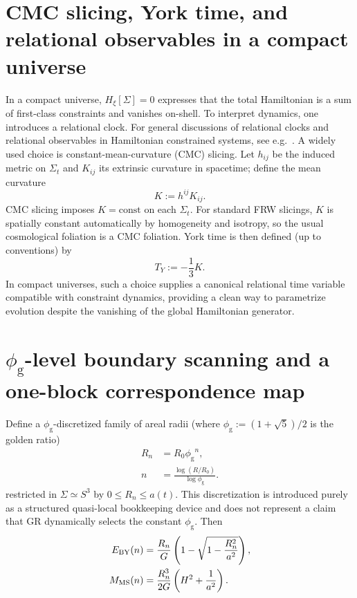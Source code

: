 \documentclass[
  reprint,
  amsmath,amssymb,
  aps,
  prd,
  superscriptaddress,
  nofootinbib,
  longbibliography
]{revtex4-2}
\newcommand{\goldconst}{\ensuremath{\phi_{\!\mathrm{g}}}} %
\begin{document}
\section{CMC slicing, York time, and relational observables in a compact universe}
In a compact universe, $H_\xi[\Sigma]=0$ expresses that the total Hamiltonian is a sum of first-class constraints and vanishes on-shell.
To interpret dynamics, one introduces a relational clock.
For general discussions of relational clocks and relational observables in Hamiltonian constrained systems, see e.g.\ \cite{BrownKuchar1995,Dittrich2006}.
A widely used choice is constant-mean-curvature (CMC) slicing. Let $h_{ij}$ be the induced metric on $\Sigma_t$ and $K_{ij}$ its extrinsic curvature in spacetime; define the mean curvature
\begin{equation}
K := h^{ij}K_{ij}.
\end{equation}
CMC slicing imposes $K=\mathrm{const}$ on each $\Sigma_t$.
For standard FRW slicings, $K$ is spatially constant automatically by homogeneity and isotropy, so the usual cosmological foliation is a CMC foliation.
York time is then defined (up to conventions) by
\begin{equation}
T_Y := -\frac{1}{3}K.
\end{equation}
In compact universes, such a choice supplies a canonical relational time variable compatible with constraint dynamics, providing a clean way to parametrize evolution despite the vanishing of the global Hamiltonian generator.
\section{\texorpdfstring{$\goldconst$}{golden-ratio}-level boundary scanning and a one-block correspondence map}
Define a $\goldconst$-discretized family of areal radii (where $\goldconst := (1+\sqrt{5})/2$ is the golden ratio)
\begin{equation}
\begin{aligned}
R_n &= R_0\goldconst^{n},\\
n   &= \frac{\log(R/R_0)}{\log\goldconst}.
\end{aligned}
\end{equation}
restricted in $\Sigma\simeq S^3$ by $0\le R_n\le a(t)$.
This discretization is introduced purely as a structured quasi-local bookkeeping device and does not represent a claim that GR dynamically selects the constant $\goldconst$.
Then
\begin{equation}
\begin{aligned}
E_{\rm BY}(n) &= \frac{R_n}{G}\left(1-\sqrt{1-\frac{R_n^2}{a^2}}\right),\\
M_{\rm MS}(n) &= \frac{R_n^3}{2G}\left(H^2+\frac{1}{a^2}\right).
\end{aligned}
\end{equation}
\end{document}
